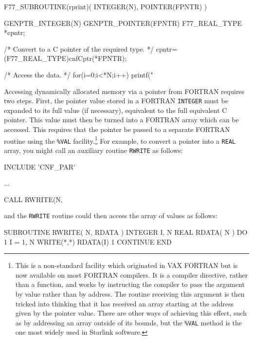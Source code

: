 \documentclass[twoside,11pt,nolof]{starlink}
\begin{document}
\begin{small}
\begin{terminalv}
F77_SUBROUTINE(rprint)( INTEGER(N), POINTER(FPNTR) )
{
   GENPTR_INTEGER(N)
   GENPTR_POINTER(FPNTR)
   F77_REAL_TYPE *cpntr;

/* Convert to a C pointer of the required type. */
   cpntr=(F77_REAL_TYPE)cnfCptr(*FPNTR);

/* Access the data. */
   for(i=0;i<*N;i++) printf("%
}
\end{terminalv}
\end{small}

Accessing dynamically allocated memory via a pointer from FORTRAN
requires two steps. First, the pointer value stored in a
FORTRAN \texttt{INTEGER} must be expanded to its full value (if
necessary), equivalent to the full equivalent C pointer. This value
must then be turned into a FORTRAN array which can be accessed. This
requires that the pointer be passed to a separate FORTRAN routine
using the \texttt{\%VAL} facility.\footnote{This is a non-standard
facility which originated in VAX FORTRAN but is now available on most
FORTRAN compilers. It is a compiler directive, rather than a function,
and works by instructing the compiler to pass the argument by value
rather than by address. The routine receiving this argument is then
tricked into thinking that it has received an array starting at the
address given by the pointer value. There are other ways of achieving
this effect, such as by addressing an array outside of its bounds, but
the \texttt{\%VAL} method is the one most widely used in Starlink
software.}  For example, to convert a pointer into a \texttt{REAL}
array, you might call an auxiliary routine \texttt{RWRITE} as
follows:
\begin{small}
\begin{terminalv}
      INCLUDE 'CNF_PAR'

      ...

      CALL RWRITE(N,%
\end{terminalv}
\end{small}
and the \texttt{RWRITE} routine could then access the array of values as
follows:
\begin{small}
\begin{terminalv}
      SUBROUTINE RWRITE( N, RDATA )
      INTEGER I, N
      REAL RDATA( N )
      DO 1 I = 1, N
         WRITE(*,*) RDATA(I)
    1 CONTINUE
      END
\end{terminalv}
\end{small}
\end{document}
